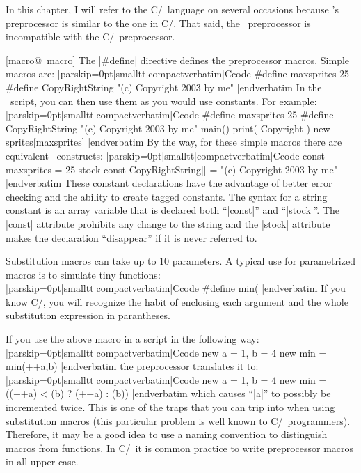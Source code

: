 In this chapter, I will refer to the C/\Cpp\ language on several occasions
because \Small's preprocessor is similar to the one in C/\Cpp. That said, the
\Small\ preprocessor is incompatible with the C/\Cpp\ preprocessor.

[macro@\midtilde\ macro]  
The |#define| directive defines the preprocessor macros. Simple macros are:
\listingx\verbatim|parskip=0pt|smalltt|compactverbatim|Ccode
#define maxsprites       25
#define CopyRightString  "(c) Copyright 2003 by me"
|endverbatim\endlistingx
In the \Small\ script, you can then use them as you would use constants. For
example:
\listingx\verbatim|parskip=0pt|smalltt|compactverbatim|Ccode
#define maxsprites  25
#define CopyRightString "(c) Copyright 2003 by me"
main()
    {
    print( Copyright )
    new sprites[maxsprites]
    }
|endverbatim\endlistingx
{}
By the way, for these simple macros there are equivalent \Small\ constructs:
\listingx\verbatim|parskip=0pt|smalltt|compactverbatim|Ccode
const maxsprites = 25
stock const CopyRightString[] = "(c) Copyright 2003 by me"
|endverbatim\endlistingx
These constant declarations have the advantage of better error checking and the
ability to create tagged constants. The syntax for a string constant is an array
variable that is declared both ``|const|'' and ``|stock|''. The |const| attribute
prohibits any change to the string and the |stock| attribute makes the declaration
``disappear'' if it is never referred to.

Substitution macros can take up to 10 parameters. A typical use for
parametrized macros is to simulate tiny functions:
\listingx\verbatim|parskip=0pt|smalltt|compactverbatim|Ccode
#define min(%
|endverbatim\endlistingx
If you know C/\Cpp, you will recognize the habit of enclosing each argument
and the whole substitution expression in parantheses.

If you use the above macro in a script in the following way:
\listingx\verbatim|parskip=0pt|smalltt|compactverbatim|Ccode
new a = 1, b = 4
new min = min(++a,b)
|endverbatim\endlistingx
the preprocessor translates it to:
\listingx\verbatim|parskip=0pt|smalltt|compactverbatim|Ccode
new a = 1, b = 4
new min = ((++a) < (b) ? (++a) : (b))
|endverbatim\endlistingx
which causes ``|a|'' to possibly be incremented twice. This is one of the traps
that you can trip into when using substitution macros (this particular
problem is well known to C/\Cpp\ programmers). Therefore, it may be a good idea
to use a naming convention to distinguish macros from functions. In C/\Cpp\
it is common practice to write preprocessor macros in all upper case.

